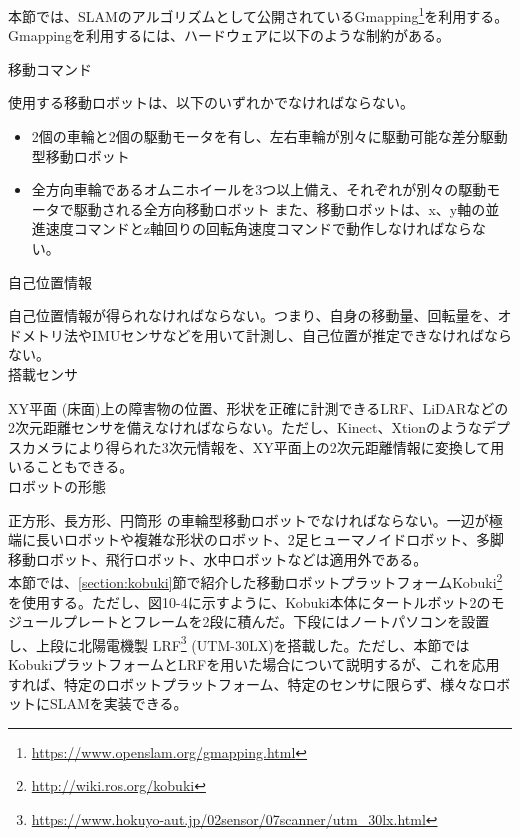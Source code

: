 本節では、SLAMのアルゴリズムとして公開されているGmapping\footnote{\url{https://www.openslam.org/gmapping.html}}を利用する。 Gmappingを利用するには、ハードウェアに以下のような制約がある。\\

\setcounter{num}{0}

\circled{\thenum} 移動コマンド

使用する移動ロボットは、以下のいずれかでなければならない。\\

\vspace{\baselineskip}
\begin{itemize}
\item 2個の車輪と2個の駆動モータを有し、左右車輪が別々に駆動可能な差分駆動型移動ロボット
\item 全方向車輪であるオムニホイールを3つ以上備え、それぞれが別々の駆動モータで駆動される全方向移動ロボット
また、移動ロボットは、x、y軸の並進速度コマンドとz軸回りの回転角速度コマンドで動作しなければならない。
\end{itemize}
\vspace{\baselineskip}

\circled{\thenum} 自己位置情報

自己位置情報が得られなければならない。つまり、自身の移動量、回転量を、オドメトリ法やIMUセンサなどを用いて計測し、自己位置が推定できなければならない。\\

\circled{\thenum} 搭載センサ

XY平面 (床面)上の障害物の位置、形状を正確に計測できるLRF、LiDARなどの2次元距離センサを備えなければならない。ただし、Kinect、Xtionのようなデプスカメラにより得られた3次元情報を、XY平面上の2次元距離情報に変換して用いることもできる。\\

\circled{\thenum} ロボットの形態

正方形、長方形、円筒形 の車輪型移動ロボットでなければならない。一辺が極端に長いロボットや複雑な形状のロボット、2足ヒューマノイドロボット、多脚移動ロボット、飛行ロボット、水中ロボットなどは適用外である。\\

本節では、\ref{section:kobuki}節で紹介した移動ロボットプラットフォームKobuki\footnote{\url{http://wiki.ros.org/kobuki}}を使用する。ただし、図10-4に示すように、Kobuki本体にタートルボット2のモジュールプレートとフレームを2段に積んだ。下段にはノートパソコンを設置し、上段に北陽電機製 LRF\footnote{\url{https://www.hokuyo-aut.jp/02sensor/07scanner/utm\_30lx.html}}  (UTM-30LX)を搭載した。ただし、本節ではKobukiプラットフォームとLRFを用いた場合について説明するが、これを応用すれば、特定のロボットプラットフォーム、特定のセンサに限らず、様々なロボットにSLAMを実装できる。

